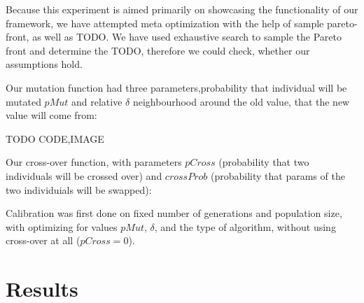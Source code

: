 \documentclass[12pt,oneside,draft]{fithesis2}
\begin{document}
Because this experiment is aimed primarily on showcasing the functionality of our framework, 
we have attempted meta optimization with the help of sample pareto-front, as well as TODO.
We have used exhaustive search to sample the Pareto front and determine the TODO,
therefore we could check, whether our assumptions hold. 

Our mutation function had three parameters,probability that individual will be mutated $pMut$ and relative $\delta$ neighbourhood around the old value, that the new value will come from:

TODO CODE,IMAGE

Our cross-over function, with parameters $pCross$ (probability that two individuals will be crossed over) and $crossProb$ (probability that params of the two individuials will be swapped):

Calibration was first done on fixed number of generations and population size, with optimizing for values $pMut$, $\delta$, and the type of algorithm, without using cross-over at all ($pCross=0$).


\section{Results}



\end{document}

